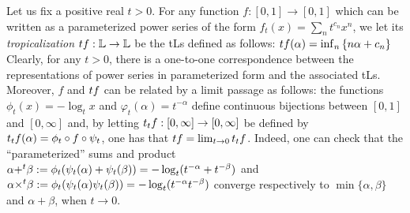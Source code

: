 Let us fix a positive real $t>0$. For any function $f:[0,1]\to [0,1]$ which can be written as a parameterized {power series} of the form $f_{t}(x)= \sum_{n}t^{c_{n}}x^{n}$, 
  we let its \emph{tropicalization} $\trop f: \Lawv \to \Lawv$ be the tLs defined as follows: $
\trop f(\alpha) =\inf_{n}\left\{ n\alpha+c_{n}\right\}
$
Clearly, for any $t>0$, there is a one-to-one correspondence between the representations of power series in parameterized form and the associated tLs. Moreover, 
$f$ and $\trop f$ can be related by a limit passage as follows: the functions $\phi_{t}(x)= -\log_{t}x$ and $\varphi_{t}(\alpha)= t^{-\alpha}$ define continuous bijections between $[0,1]$ and $[0,\infty]$ and, by letting
$\trop_{t}f: [0,\infty]\to [0,\infty]$ be defined by 
$\trop_{t}f(\alpha)= \phi_{t}\circ f \circ \psi_{t}$, one has that 
$\trop f= \lim_{t\to 0}\trop_{t}f$. 
Indeed, one can check that the ``parameterized'' sums and product $\alpha {+}^{t}\beta:= \phi_{t}(\psi_{t}(\alpha)+\psi_{t}(\beta))= -\log_{t}(t^{-\alpha}+t^{-\beta})$ and 
$\alpha {\times}^{t}\beta:= \phi_{t}( \psi_{t}(\alpha)\psi_{t}(\beta))=
-\log_{t}(t^{-\alpha}t^{-\beta})$ converge respectively to $\min\{\alpha,\beta\}$ and $\alpha+\beta$, when $t\to 0$.

